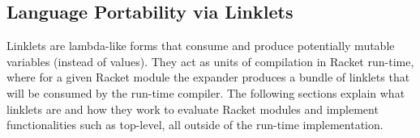 \subsection{Language Portability via Linklets}
\label{subsec:linklets}

Linklets are lambda-like forms that consume and produce potentially
mutable variables (instead of values). They act as units of
compilation in Racket run-time, where for a given Racket module the
expander produces a bundle of linklets that will be consumed by the
run-time compiler. The following sections explain what linklets are
and how they work to evaluate Racket modules and implement
functionalities such as top-level, all outside of the run-time
implementation.



